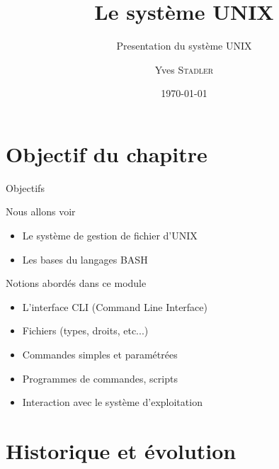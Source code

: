 
\title{Le système UNIX}
\subtitle{Presentation du système UNIX}

\author{Yves \textsc{Stadler}}

\date{\today}






\begin{frame}
\titlepage
\end{frame}


\section{Objectif du chapitre}
\begin{frame}{Objectifs}
\begin{alertblock}{Nous allons voir}
\begin{itemize}
\item Le système de gestion de fichier d'UNIX
\item Les bases du langages BASH
\end{itemize}
\end{alertblock}

\begin{block}{Notions abordés dans ce module}
\begin{itemize}
\item L'interface CLI (Command Line Interface)
\item Fichiers (types, droits, etc...)
\item Commandes simples et paramétrées
\item Programmes de commandes, scripts
\item Interaction avec le système d’exploitation
\end{itemize}
\end{block}
\end{frame}

\section{Historique et évolution}
